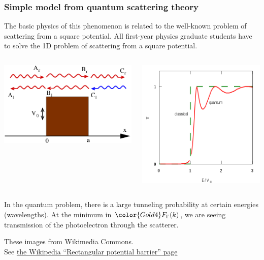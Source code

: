 \documentclass[10pt, xcolor=x11names, compress]{beamer}
\begin{document}
\begin{frame}
  \frametitle{Simple model from quantum scattering theory}
  The basic physics of this phenomenon is related to the well-known
  problem of scattering from a square potential.  All first-year
  physics graduate students have to solve the 1D problem of scattering
  from a square potential.
  \begin{columns}[T]
    \begin{column}{0.6\linewidth}
      \centering\includegraphics[width=0.7\linewidth]{Finitepot.png}
    \end{column}
    \begin{column}{0.4\linewidth}
      \includegraphics[width=0.7\linewidth]{Finitebarrdiag.png}      
    \end{column}
  \end{columns}
  In the quantum problem, there is a large tunneling probability at
  certain energies (wavelengths).  At the minimum in
  ${\color{Gold4}F_\Gamma(k)}$, we are seeing transmission of the
  photoelectron through the scatterer.
  \begin{bottomnote}[0.7][19.5]%
    These images from Wikimedia Commons.\\See
    \href{http://en.wikipedia.org/wiki/Rectangular_potential_barrier}
    {\color{LightBlue2}the Wikipedia ``Rectangular potential barrier'' page}
  \end{bottomnote}
\end{frame}
\end{document}
